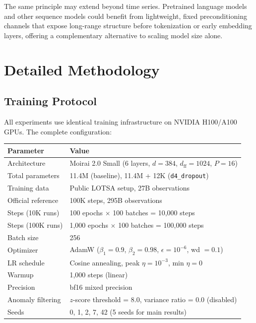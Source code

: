 \documentclass{article}
\begin{document}
The same principle may extend beyond time series. Pretrained language models and other sequence models could benefit from lightweight, fixed preconditioning channels that expose long-range structure before tokenization or early embedding layers, offering a complementary alternative to scaling model size alone.





\newpage
\appendix
\onecolumn

\section{Detailed Methodology}
\label{app:methodology}

\subsection{Training Protocol}

All experiments use identical training infrastructure on NVIDIA H100/A100 GPUs. The complete configuration:

\begin{center}
\small
\begin{tabular}{ll}
\toprule
\textbf{Parameter} & \textbf{Value} \\
\midrule
Architecture & Moirai 2.0 Small (6 layers, $d=384$, $d_{\text{ff}}=1024$, $P=16$) \\
Total parameters & 11.4M (baseline), 11.4M + 12K (\texttt{d4\_dropout}) \\
Training data & Public LOTSA setup, 27B observations \\
Official reference & 100K steps, 295B observations \\
Steps (10K runs) & 100 epochs $\times$ 100 batches = 10,000 steps \\
Steps (100K runs) & 1,000 epochs $\times$ 100 batches = 100,000 steps \\
Batch size & 256 \\
Optimizer & AdamW ($\beta_1=0.9$, $\beta_2=0.98$, $\epsilon=10^{-6}$, wd $=0.1$) \\
LR schedule & Cosine annealing, peak $\eta = 10^{-3}$, min $\eta = 0$ \\
Warmup & 1,000 steps (linear) \\
Precision & bf16 mixed precision \\
Anomaly filtering & $z$-score threshold = 8.0, variance ratio = 0.0 (disabled) \\
Seeds & 0, 1, 2, 7, 42 (5 seeds for main results) \\
\bottomrule
\end{tabular}
\end{center}
\end{document}
